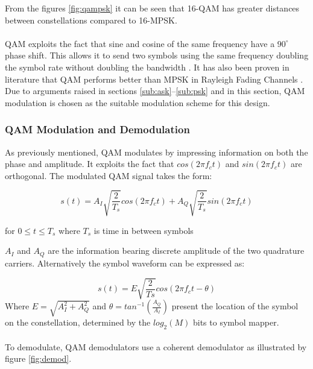 \documentclass[11pt]{report}
\begin{document}
From the figures \ref{fig:qampsk} it can be seen that 16-QAM has greater distances between constellations compared to 16-MPSK.
\\
\\
QAM exploits the fact that sine and cosine of the same frequency have a $90^{\circ}$  phase shift. This allows it to send two symbols using the same frequency doubling the symbol rate without doubling the bandwidth \cite{68}. It has also been proven in literature that QAM performs better than MPSK in Rayleigh Fading Channels \cite{67,65,66}. Due to arguments raised in sections \ref{sub:ask}--\ref{sub:psk} and in this section, QAM modulation is chosen as the suitable modulation scheme for this design.

\subsubsection{QAM Modulation and Demodulation}
\label{subsub:qam}
As previously mentioned, QAM modulates by impressing information on both the phase and amplitude. It exploits the fact that $cos(2\pi f_ct)$ and $sin(2\pi f_ct)$ are orthogonal. The modulated QAM signal takes the form:

\begin{equation}
 s(t) = A_I\sqrt{\frac{2}{T_s}}cos(2\pi f_ct) +  A_Q\sqrt{\frac{2}{T_s}}sin(2\pi f_ct) 
\end{equation}

\begin{center}
for $0 \le t \le T_s$
where $T_s$ is time in between symbols
\end{center}

$A_I$ and $A_Q$ are the information bearing discrete amplitude of the two quadrature carriers. Alternatively the symbol waveform can be expressed as:

\begin{equation}
s(t) = E\sqrt{\frac{2}{Ts}}cos(2\pi f_ct - \theta)
\end{equation}
Where $E =\sqrt{A_I^2 + A_Q^2} $ and $\theta = tan^{-1}(\frac{A_Q}{A_I})$ present the location of the symbol on the constellation, determined by the $log_2(M)$ bits to symbol mapper.
\\
\\
To demodulate, QAM demodulators use a coherent demodulator as illustrated by figure \ref{fig:demod}.
\end{document}
